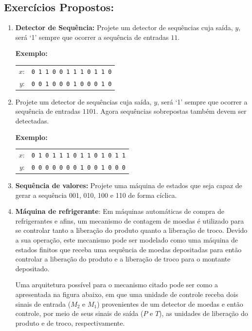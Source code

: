 \documentclass[12pt]{article}
\begin{document}
\subsection{Exercícios Propostos:}
\begin{enumerate}[label=\textbf{\arabic*.}]
\item \textbf{Detector de Sequência:} Projete um detector de sequências cuja saída, $y$, será `1' sempre que ocorrer a sequência de entradas $11$.
    
    \medskip
    \textbf{Exemplo:}
    \begin{center}
    \begin{tabular}{r l}
        $x$: & \texttt{0 1 1 0 0 1 1 1 0 1 1 0} \\
        $y$: & \texttt{0 0 1 0 0 0 1 0 0 0 1 0}
    \end{tabular}
    \end{center}
    \medskip



\item Projete um detector de sequências cuja saída, $y$, será `1' sempre que ocorrer a sequência de entradas $1101$. Agora sequências sobrepostas também devem ser detectadas.
    
    \medskip
    \textbf{Exemplo:}
    \begin{center}
    \begin{tabular}{r l}
        $x$: & \texttt{0 1 0 1 1 1 0 1 1 0 1 0 1 1} \\
        $y$: & \texttt{0 0 0 0 0 0 0 1 0 0 1 0 0 0}
    \end{tabular}
    \end{center}
    \medskip

\item \textbf{Sequência de valores:} Projete uma máquina de estados que seja capaz de gerar a sequência 001, 010, 100 e 110 de forma cíclica.

\item \textbf{Máquina de refrigerante}: Em máquinas automáticas de compra de refrigerantes e afins, um mecanismo de contagem de moedas é utilizado para se controlar tanto a liberação do produto quanto a liberação de troco. Devido a sua operação, este mecanismo pode ser modelado como uma máquina de estados finitos que receba uma sequência de moedas depositadas para então controlar a liberação do produto e a liberação de troco para o montante depositado.
    
    Uma arquitetura possível para o mecanismo citado pode ser como a apresentada na figura abaixo, em que uma unidade de controle receba dois sinais de entrada ($M_2$ e $M_1$) provenientes de um detector de moedas e então controle, por meio de seus sinais de saída ($P$ e $T$), as unidades de liberação do produto e de troco, respectivamente.


\end{enumerate}
\end{document}
